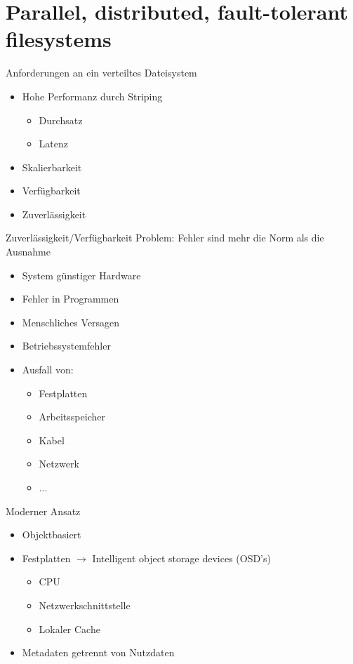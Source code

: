 \documentclass[hyperref={xetex}]{beamer}
\begin{document}
\section{Parallel, distributed, fault-tolerant filesystems}
\begin{frame}{Anforderungen an ein verteiltes Dateisystem}
	\begin{itemize}
		\item Hohe Performanz durch Striping
			\begin{itemize}
				\item Durchsatz
				\item Latenz
			\end{itemize}
		\item Skalierbarkeit
		\item Verf\"ugbarkeit
		\item Zuverl\"assigkeit
	\end{itemize}
\end{frame}

\begin{frame}{Zuverl\"assigkeit/Verf\"ugbarkeit}
	Problem: Fehler sind mehr die Norm als die Ausnahme
	\begin{itemize}
		\item System g\"unstiger Hardware
		\item Fehler in Programmen %
		\item Menschliches Versagen %
		\item Betriebssystemfehler %
		\item Ausfall von: 
		\begin{itemize}
			\item Festplatten
			\item Arbeitsspeicher
			\item Kabel
			\item Netzwerk
			\item ...
		\end{itemize}
	\end{itemize}		
\end{frame}

\begin{frame}{Moderner Ansatz}
	\begin{itemize}
		\item Objektbasiert
		\item Festplatten $\rightarrow$ Intelligent object storage devices (OSD's)
		\begin{itemize}
			\item CPU
			\item Netzwerkschnittstelle
			\item Lokaler Cache
		\end{itemize}
		\item Metadaten getrennt von Nutzdaten
	\end{itemize}
\end{frame}
\end{document}
